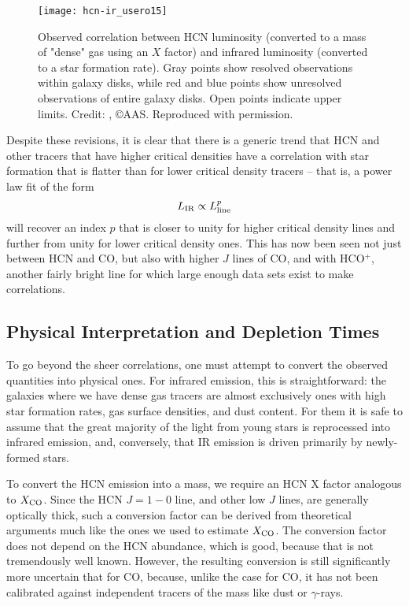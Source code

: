 \begin{figure}
\texttt{[image: hcn-ir\_usero15]}
\caption[Infrared-HCN luminosity correlation]{
\label{fig:hcn-ir}
Observed correlation between HCN luminosity (converted to a mass of "dense" gas using an $X$ factor) and infrared luminosity (converted to a star formation rate). Gray points show resolved observations within galaxy disks, while red and blue points show unresolved observations of entire galaxy disks. Open points indicate upper limits. Credit: \citet{usero15a}, \copyright AAS. Reproduced with permission.
}
\end{figure}

Despite these revisions, it is clear that there is a generic trend that HCN and other tracers that have higher critical densities have a correlation with star formation that is flatter than for lower critical density tracers -- that is, a power law fit of the form
\begin{equation}
L_{\rm IR} \propto L_{\rm line}^p
\end{equation}
will recover an index $p$ that is closer to unity for higher critical density lines and further from unity for lower critical density ones. This has now been seen not just between HCN and CO, but also with higher $J$ lines of CO, and with HCO$^+$, another fairly bright line for which large enough data sets exist to make correlations.

\subsection{Physical Interpretation and Depletion Times}

To go beyond the sheer correlations, one must attempt to convert the observed quantities into physical ones. For infrared emission, this is straightforward: the galaxies where we have dense gas tracers are almost exclusively ones with high star formation rates, gas surface densities, and dust content. For them it is safe to assume that the great majority of the light from young stars is reprocessed into infrared emission, and, conversely, that IR emission is driven primarily by newly-formed stars.

To convert the HCN emission into a mass, we require an HCN X factor analogous to $X_{\rm CO}$. Since the HCN $J=1-0$ line, and other low $J$ lines, are generally optically thick, such a conversion factor can be derived from theoretical arguments much like the ones we used to estimate $X_{\rm CO}$. The conversion factor does not depend on the HCN abundance, which is good, because that is not tremendously well known. However, the resulting conversion is still significantly more uncertain that for CO, because, unlike the case for CO, it has not been calibrated against independent tracers of the mass like dust or $\gamma$-rays.

